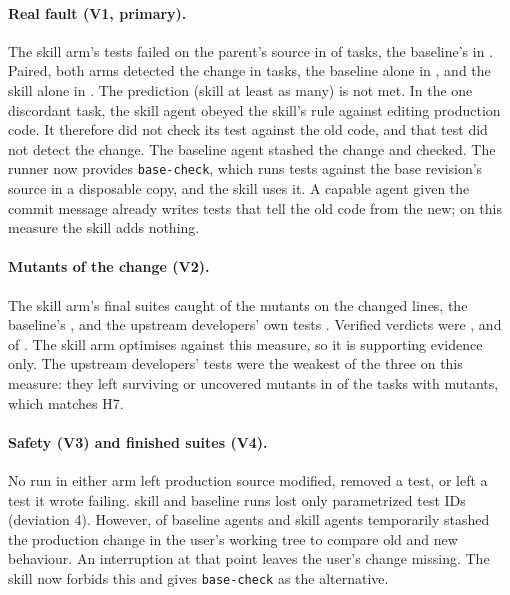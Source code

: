 \paragraph{Real fault (V1, primary).} The skill arm's tests failed on the parent's source in \VOneSkill{} of \VTasks{} tasks, the baseline's in \VOneBase{}. Paired, both arms detected the change in \VPairBoth{} tasks, the baseline alone in \VPairBaseOnly{}, and the skill alone in \VPairSkillOnly{}. The prediction (skill at least as many) is not met. In the one discordant task, the skill agent obeyed the skill's rule against editing production code. It therefore did not check its test against the old code, and that test did not detect the change. The baseline agent stashed the change and checked. The runner now provides \texttt{base-check}, which runs tests against the base revision's source in a disposable copy, and the skill uses it. A capable agent given the commit message already writes tests that tell the old code from the new; on this measure the skill adds nothing.

\paragraph{Mutants of the change (V2).} The skill arm's final suites caught \VTwoSkillRate{} of the mutants on the changed lines, the baseline's \VTwoBaseRate{}, and the upstream developers' own tests \VTwoUpRate{}. Verified verdicts were \VTwoSkillVerified{}, \VTwoBaseVerified{} and \VTwoUpVerified{} of \VTasks{}. The skill arm optimises against this measure, so it is supporting evidence only. The upstream developers' tests were the weakest of the three on this measure: they left surviving or uncovered mutants in \VUpWithSurvivors{} of the \VUpWithMutants{} tasks with mutants, which matches H7.

\paragraph{Safety (V3) and finished suites (V4).} No run in either arm left production source modified, removed a test, or left a test it wrote failing. \VThreeSkillIdChanges{} skill and \VThreeBaseIdChanges{} baseline runs lost only parametrized test IDs (deviation 4). However, \VInPlaceBase{} of \VTasks{} baseline agents and \VInPlaceSkill{} skill agents temporarily stashed the production change in the user's working tree to compare old and new behaviour. An interruption at that point leaves the user's change missing. The skill now forbids this and gives \texttt{base-check} as the alternative.

